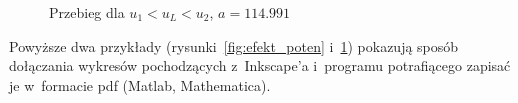\begin{figure}[tp]
    \caption{Przebieg dla $u_1 < u_L < u_2$, $a=114.991$}
    \label{fig:ul5}
\end{figure}

{\red
  Powyższe dwa przykłady (rysunki~\ref{fig:efekt_poten} i~\ref{fig:ul5}) pokazują sposób dołączania wykresów pochodzących z~Inkscape'a i~programu potrafiącego zapisać je w~formacie pdf (Matlab, Mathematica).}

\noindent
[\ldots]

